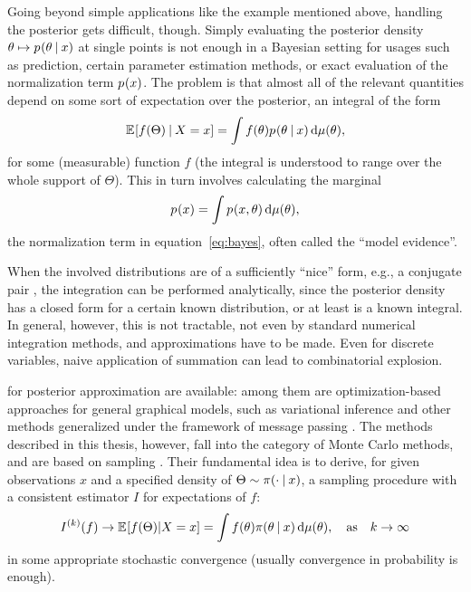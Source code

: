 Going beyond simple applications like the example mentioned above, hand\-ling the posterior gets
difficult, though.  Simply evaluating the posterior density
\(\theta \mapsto \prob{\theta \given x}\) at single points is not enough in a Bayesian setting for
usages such as prediction, certain parameter estimation methods, or exact evaluation of the
normalization term \(\prob{x}\).  The problem is that almost all of the relevant quantities depend
on some sort of expectation over the posterior, an integral of the form
\begin{equation}
  \label{eq:posterior-expectation}
  \Exp{f(\Theta) \given X = x} = \int f(\theta) \prob{\theta \given x} \dif \mu(\theta),
\end{equation}
for some (measurable) function \(f\) (the integral is understood to range over the whole support of
\(\Theta\)). This in turn involves calculating the marginal
\begin{equation}
  \label{eq:normalizing}
  \prob{x} = \int \prob{x, \theta} \dif \mu(\theta),
\end{equation}
the normalization term in equation~\eqref{eq:bayes}, often called the \enquote{model evidence}.

When the involved distributions are of a sufficiently \enquote{nice} form, e.g., a conjugate pair
\parencites[see][chapter 2.2.2]{marin2007bayesian}[chapter 9.2.5]{murphy2012machine}, the
integration can be performed analytically, since the posterior density has a closed form for a
certain known distribution, or at least is a known integral.  In general, however, this is not
tractable, not even by standard numerical integration methods, and approximations have to be made.
Even for discrete variables, naive application of summation can lead to combinatorial explosion.

 for posterior approximation are available: among them are
optimization-based approaches for general graphical models, such as variational inference
\parencite[chapter 21 and 22]{murphy2012machine} and other methods generalized under the framework
of message passing \parencite{minka2005divergence}.  The methods described in this thesis, however,
fall into the category of Monte Carlo methods, and are based on sampling \parencites[chapter
23]{murphy2012machine}{vihola2020lectures}.  Their fundamental idea is to derive, for given
observations \(x\) and a specified density of \(\Theta \sim \pi(\cdot \:\vert\: x)\), a sampling
procedure with a consistent estimator \(I\) for expectations of \(f\):
\begin{equation}
  \label{eq:mc-methods}
  \kth{I}(f) \to \Exp{f(\Theta) | X = x} = \int f(\theta) \pi(\theta \given x) \dif\mu(\theta), \quad \text{as} \quad k
  \to \infty
\end{equation}
in some appropriate stochastic convergence (usually convergence in probability is enough).

